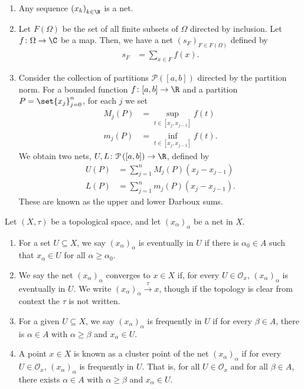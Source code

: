 \begin{example}\hfill
\begin{enumerate}[(1)]
  \item Any sequence $\left(x_k\right)_{k\in \N}$ is a net.
  \item Let $F\left(\Omega\right)$ be the set of all finite subsets of $\Omega$ directed by inclusion. Let $f\colon \Omega\rightarrow \C$ be a map. Then, we have a net $\left(s_F\right)_{F\in F\left(\Omega\right)}$ defined by
    \begin{align*}
      s_F &= \sum_{x\in F}f\left(x\right).
    \end{align*}
  \item Consider the collection of partitions $\mathcal{P}\left([a,b]\right)$ directed by the partition norm. For a bounded function $f\colon [a,b]\rightarrow \R$ and a partition $P = \set{x_j}_{j=0}^{n}$, for each $j$ we set
    \begin{align*}
      M_j\left(P\right) &= \sup_{t\in \left[x_j,x_{j-1}\right]}f(t)\\
      m_j\left(P\right) &= \inf_{t\in \left[x_j,x_{j-1}\right]}f(t).
    \end{align*}
    We obtain two nets, $U,L\colon \mathcal{P}\left([a,b]\right)\rightarrow \R$, defined by
    \begin{align*}
      U\left(P\right) &= \sum_{j=1}^{n}M_j\left(P\right)\left(x_j - x_{j-1}\right)\\
      L\left(P\right) &= \sum_{j=1}^{n}m_j\left(P\right)\left(x_j-x_{j-1}\right).
    \end{align*}
    These are known as the upper and lower Darboux sums.
\end{enumerate}
\end{example}
\begin{definition}
  Let $\left(X,\tau\right)$ be a topological space, and let $\left(x_{\alpha}\right)_{\alpha}$ be a net in $X$.
  \begin{enumerate}[(1)]
    \item For a set $U\subseteq X$, we say $\left(x_{\alpha}\right)_{\alpha}$ is eventually in $U$ if there is $\alpha_0\in A$ such that $x_{\alpha}\in U$ for all $\alpha \geq \alpha_0$.
    \item We say the net $\left(x_{\alpha}\right)_{\alpha}$ converges to $x\in X$ if, for every $U\in \mathcal{O}_{x}$, $\left(x_{\alpha}\right)_{\alpha}$ is eventually in $U$. We write $\left(x_{\alpha}\right)_{\alpha}\xrightarrow{\tau}x$, though if the topology is clear from context the $\tau$ is not written.
    \item For a given $U\subseteq X$, we say $\left(x_{\alpha}\right)_{\alpha}$ is frequently in $U$ if for every $\beta \in A$, there is $\alpha \in A$ with $\alpha \geq \beta$ and $x_{\alpha}\in U$.
    \item A point $x\in X$ is known as a cluster point of the net $\left(x_{\alpha}\right)_{\alpha}$ if for every $U\in \mathcal{O}_{x}$, $\left(x_{\alpha}\right)_{\alpha}$ is frequently in $U$. That is, for all $U\in \mathcal{O}_{x}$ and for all $\beta \in A$, there exists $\alpha \in A$ with $\alpha \geq \beta$ and $x_{\alpha}\in U$.
  \end{enumerate}
\end{definition}
